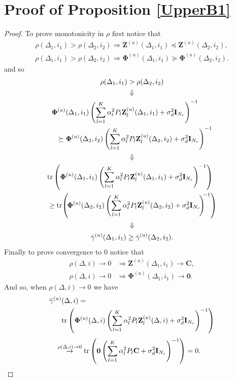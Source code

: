 \documentclass[conference, a4paper, 10pt]{IEEEtran}
\newcommand{\mx}[1]{\mathbf{#1}}
\newcommand{\bs}[1]{\boldsymbol{#1}}
\begin{document}
\section{Proof of Proposition \ref{UpperB1}}
\label{Sec:P2}
\begin{proof}
To prove monotonicity in $\rho$ first notice that
\begin{align*}
\rho(\Delta_1, i_1) > \rho(\Delta_2, i_2) \Rightarrow \mx{Z}^{(u)}(\Delta_1,i_1) \preceq  \mx{Z}^{(u)}(\Delta_2,i_2), \\
\rho(\Delta_1, i_1) > \rho(\Delta_2, i_2) \Rightarrow \bs{\Phi}^{(u)}(\Delta_1,i_1) \succeq  \bs{\Phi}^{(u)}(\Delta_2,i_2).
\end{align*}
and so
\begin{gather*}
\rho(\Delta_1, i_1) > \rho(\Delta_2, i_2)
\\
\Downarrow
\\
\begin{align*}
&\bs{\Phi}^{(u)}(\Delta_1,i_1) \left( \sum_{l = 1}^K \alpha_l^2 P_l \mx{Z}^{(u)}_l(\Delta_1, i_1) + \sigma_d^2 \mx{I}_{N_r} \right)^{-1}  \\
&~~\succeq \bs{\Phi}^{(u)}(\Delta_2,i_2) \left( \sum_{l = 1}^K \alpha_l^2 P_l \mx{Z}^{(u)}_l(\Delta_2, i_2) + \sigma_d^2 \mx{I}_{N_r} \right)^{-1}
\end{align*}
\\
\Downarrow
\\
\begin{align*}
&\textup{tr} \left(\bs{\Phi}^{(u)}(\Delta_1,i_1) \left( \sum_{l = 1}^K \alpha_l^2 P_l \mx{Z}^{(u)}_l(\Delta_1, i_1) + \sigma_d^2 \mx{I}_{N_r} \right)^{-1}\right)  \\
&\geq \textup{tr} \! \left( \!\bs{\Phi}^{(u)}(\Delta_2,i_2) \left( \sum_{l = 1}^K \alpha_l^2 P_l \mx{Z}^{(u)}_l(\Delta_2, i_2) + \sigma_d^2 \mx{I}_{N_r}\! \right)^{\!\!-1}\right)
\end{align*}
\\
\Downarrow
\\
\bar{\gamma}^{(u)}(\Delta_1,i_1) \geq \bar{\gamma}^{(u)}(\Delta_2,i_2).
\end{gather*}
Finally to prove convergence to 0 notice that
\begin{align*}
    \rho(\Delta, i) \rightarrow 0 &\Rightarrow \mx{Z}^{(u)}(\Delta_1,i_1) \rightarrow \mx{C}, \\
    \rho(\Delta, i) \rightarrow 0 &\Rightarrow \bs{\Phi}^{(u)}(\Delta_1,i_1) \rightarrow \mx{0}.
\end{align*}
And so, when $ \rho(\Delta, i) \rightarrow 0$ we have
\begin{align*}
    \bar{\gamma}^{(u)}&(\Delta,i) = \\
    &\textup{tr} \left(\bs{\Phi}^{(u)}(\Delta,i) \left( \sum_{l = 1}^K \alpha_l^2 P_l \mx{Z}^{(u)}_l(\Delta, i) + \sigma_d^2 \mx{I}_{N_r} \right)^{-1}\right)
\end{align*}
\begin{align*}
   & \stackrel{\rho(\Delta, i) \rightarrow 0}{\rightarrow}\textup{tr} \left(\mx{0} \left( \sum_{l = 1}^K \alpha_l^2 P_l \mx{C} + \sigma_d^2 \mx{I}_{N_r} \right)^{-1}\right) = 0.
\end{align*}
\end{proof}
\end{document}
